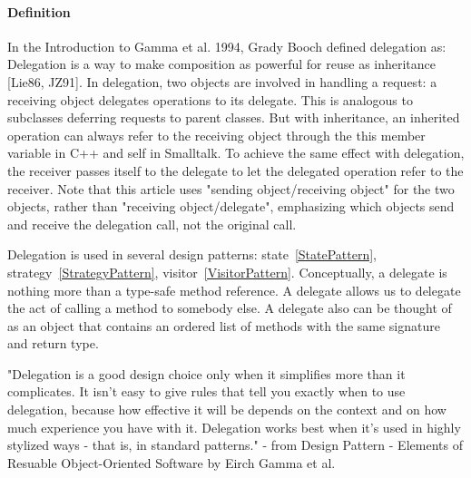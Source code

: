 \documentclass{book}
\begin{document}
\paragraph{Definition}
In the Introduction to Gamma et al. 1994, Grady Booch defined delegation as:
Delegation is a way to make composition as powerful for reuse as inheritance [Lie86, JZ91]. 
In delegation, two objects are involved in handling a request: a receiving object delegates operations to its delegate.
This is analogous to subclasses deferring requests to parent classes. 
But with inheritance, an inherited operation can always refer to the receiving object through the this member variable in C++ and self in Smalltalk.
To achieve the same effect with delegation, the receiver passes itself to the delegate to let the delegated operation refer to the receiver.
Note that this article uses "sending object/receiving object" for the two objects,
rather than "receiving object/delegate", emphasizing which objects send and receive the delegation call, not the original call.

Delegation is used in several design patterns: state~\ref{StatePattern}, strategy~\ref{StrategyPattern}, visitor~\ref{VisitorPattern}.
Conceptually, a delegate is nothing more than a type-safe method reference.
A delegate allows us to delegate the act of calling a method to somebody else.
A delegate also can be thought of as an object that contains an ordered list of methods with the same signature and return type. 

"Delegation is a good design choice only when it simplifies more than it complicates.
It isn't easy to give rules that tell you exactly when to use delegation, because how effective it will be depends on the context and on how much experience you have with it. 
Delegation works best when it's used in highly stylized ways - that is, in standard patterns." - from Design Pattern - Elements of Resuable Object-Oriented Software by Eirch Gamma et al.
\end{document}
